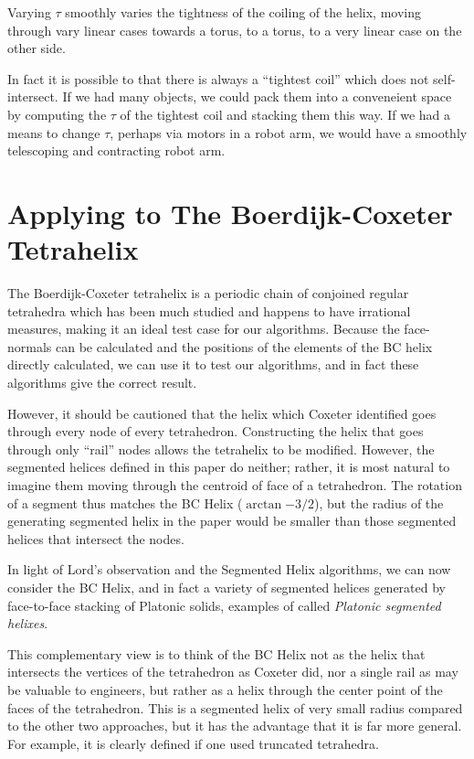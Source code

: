 \documentclass[11pt]{article}
\begin{document}
{Varying $\tau$ smoothly varies the tightness of the coiling of the helix, moving through vary linear cases towards a torus,
to a torus, to a very linear case on the other side.

In fact it is possible to that there is always a ``tightest coil'' which does not self-intersect. If we had many objects,
we could pack them into a conveneient space by computing the $\tau$ of the tightest coil and stacking them this way.
If we had a means to change $\tau$, perhaps via motors in a robot arm, we would have a smoothly telescoping and contracting
robot arm.


\section{Applying to The Boerdijk-Coxeter Tetrahelix}

The Boerdijk-Coxeter tetrahelix is a periodic chain of conjoined regular tetrahedra
which has been much studied\cite{coxeter1985simplicial,sadler2013periodic,fuller1982synergetics,read2018transforming} and happens to have irrational measures, making it an ideal
test case for our algorithms. Because the face-normals can be calculated and the
positions of the elements of the BC helix directly calculated, we can use
it to test our algorithms, and in fact these algorithms give the correct result.

However, it should be cautioned that the helix which Coxeter identified\cite{coxeter1985simplicial} goes through every node of every tetrahedron. Constructing the helix that goes
through only ``rail'' nodes allows the tetrahelix to be modified\cite{read2018transforming}.
However, the segmented helices defined in this paper do neither; rather, it is most natural to
imagine them moving through the centroid of face of a tetrahedron. The rotation of a
segment thus matches the BC Helix ($\arctan{-3/2}$), but the radius of the
generating segmented helix in the paper would be smaller than those segmented helices that intersect the nodes.

In light of Lord's observation and the Segmented Helix algorithms, we can now
consider the BC Helix, and in fact a variety of segmented helices generated by
face-to-face stacking of Platonic solids, examples of called {\em Platonic segmented helixes}.

This complementary view is to think of the BC Helix not as the helix that
intersects the vertices of the tetrahedron as Coxeter did\cite{coxeter1985simplicial}, nor a single
rail as may be valuable to engineers\cite{read2018transforming}, but rather as a helix through
the center point of the faces of the tetrahedron. This is a segmented helix of
very small radius compared to the other two approaches, but it has
the advantage that it is far more general. For example, it is
clearly defined if one used truncated tetrahedra.

}
\end{document}
